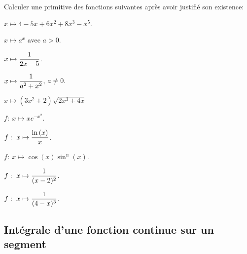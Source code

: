 \documentclass[a4paper, 11pt]{article}
\begin{document}
{\footnotesize \begin{exo}
		Calculer une primitive des fonctions suivantes apr\`{e}s avoir justifi\'e son existence:\\
		\begin{enumerate}
			\begin{minipage}[t]{0.48\textwidth}
				\item $x\mapsto 4-5x+6x^2+8x^3-x^5$.
				\item $x\mapsto a^x$ avec $a>0$.
				\item $x\mapsto \displaystyle\frac{1}{2x-5}$.
				\item  $x\mapsto \displaystyle\frac{1}{a^2+x^2}$, $a\not= 0$.
				\item $x\mapsto (3x^2+2)\sqrt{2x^3+4x}$
			\end{minipage}
			\begin{minipage}[t]{0.48\textwidth}
				\item  $f:\ x\mapsto xe^{-x^2} $.
				\item  $f:\ x\mapsto  \ddp\frac{\ln{(x)}}{x}$.
				\item $f:\ x\mapsto \cos{(x)}\sin^n{(x)} $.
				\item  $f:\ x\mapsto \displaystyle\frac{1}{(x-2)^2} $.
				\item $f:\ x\mapsto \displaystyle\frac{1}{(4-x)^3} $.
			\end{minipage}


		\end{enumerate}
	\end{exo}
}

\subsection{Int\'egrale d'une fonction continue sur un segment}
\end{document}
